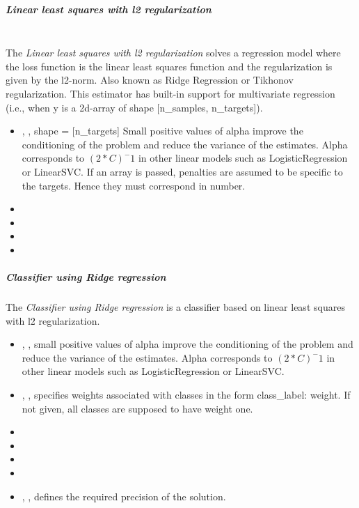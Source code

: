 \subparagraph{Linear least squares with l2 regularization}
\mbox{}
\\The \textit{Linear least squares with l2 regularization} solves a regression
model where the loss function is the linear least squares function and the
regularization is given by the l2-norm.
%
Also known as Ridge Regression or Tikhonov regularization.
%
This estimator has built-in support for multivariate regression (i.e., when y
is a 2d-array of shape [n\_samples, n\_targets]).
%
\begin{itemize}
  \item {}, ,
  shape = [n\_targets] Small positive values of alpha improve the
  conditioning of the problem and reduce the variance of the estimates.
  Alpha corresponds to $(2*C)^-1$ in other linear models such as
  LogisticRegression or LinearSVC.
  If an array is passed, penalties are assumed to be specific to the targets.
  Hence they must correspond in number.
  \item {}
  \item {}
  \item {}
  \item \solverDescription
\end{itemize}

\subparagraph{Classifier using Ridge regression}
\mbox{}

The \textit{Classifier using Ridge regression} is a classifier based on linear
least squares with l2 regularization.

\begin{itemize}
  \item {}, , small positive values of alpha improve
  the conditioning of the problem and reduce the variance of the estimates.
  Alpha corresponds to $(2*C)^-1$ in other linear models such as
  LogisticRegression or LinearSVC.
  \item {}, , specifies
  weights associated with classes in the form {class\_label: weight}.
  If not given, all classes are supposed to have weight one.
  \item {}
  \item {}
  \item {}
  \item \solverDescription
  \item {}, , defines the required precision of the
  solution.
\end{itemize}

